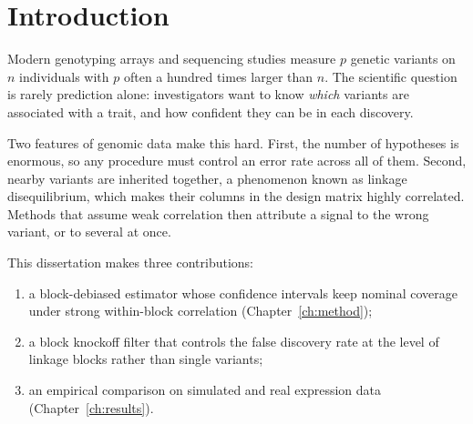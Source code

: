 \chapter{Introduction}
\label{ch:introduction}

Modern genotyping arrays and sequencing studies measure $p$ genetic variants on $n$
individuals with $p$ often a hundred times larger than $n$. The scientific question is rarely
prediction alone: investigators want to know \emph{which} variants are associated with a trait,
and how confident they can be in each discovery.

Two features of genomic data make this hard. First, the number of hypotheses is enormous, so
any procedure must control an error rate across all of them. Second, nearby variants are
inherited together, a phenomenon known as linkage disequilibrium, which makes their columns
in the design matrix highly correlated. Methods that assume weak correlation then attribute a
signal to the wrong variant, or to several at once.

This dissertation makes three contributions:
\begin{enumerate}
  \item a block-debiased estimator whose confidence intervals keep nominal coverage under strong
        within-block correlation (Chapter~\ref{ch:method});
  \item a block knockoff filter that controls the false discovery rate at the level of linkage
        blocks rather than single variants;
  \item an empirical comparison on simulated and real expression data (Chapter~\ref{ch:results}).
\end{enumerate}
